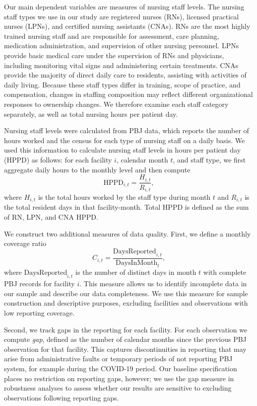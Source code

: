 \documentclass[preprint,authoryear]{elsarticle}
\begin{document}
Our main dependent variables are measures of nursing staff levels. The nursing staff types we use in our study are registered nurses (RNs), licensed practical nurses (LPNs), and certified nursing assistants (CNAs). RNs are the most highly trained nursing staff and are responsible for assessment, care planning, medication administration, and supervision of other nursing personnel. LPNs provide basic medical care under the supervision of RNs and physicians, including monitoring vital signs and administering certain treatments. CNAs provide the majority of direct daily care to residents, assisting with activities of daily living. Because these staff types differ in training, scope of practice, and compensation, changes in staffing composition may reflect different organizational responses to ownership changes. We therefore examine each staff category separately, as well as total nursing hours per patient day. 

Nursing staff levels were calculated from PBJ data, which reports the number of hours worked and the census for each type of nursing staff on a daily basis. We used this information to calculate nursing staff levels in hours per patient day (HPPD) as follows: for each facility $i$, calendar month $t$, and staff type, we first aggregate daily hours to the monthly level and then compute
\begin{equation}
  \text{HPPD}_{i,t} = \frac{H_{i,t}}{R_{i,t}},
\end{equation}
where $H_{i,t}$ is the total hours worked by the staff type during month $t$ and $R_{i,t}$ is the total resident days in that facility-month. Total HPPD is defined as the sum of RN, LPN, and CNA HPPD.

We construct two additional measures of data quality. First, we define a monthly coverage ratio
\[
  C_{i,t} = \frac{\text{DaysReported}_{i,t}}{\text{DaysInMonth}_t},
\]
where $\text{DaysReported}_{i,t}$ is the number of distinct days in month $t$ with complete PBJ records for facility $i$. This measure allows us to identify incomplete data in our sample and describe our data completeness. We use this measure for sample construction and descriptive purposes, excluding facilities and observations with low reporting coverage.

Second, we track gaps in the reporting for each facility. For each observation we compute \textit{gap}, defined as the number of calendar months since the previous PBJ observation for that facility. This captures discontinuities in reporting that may arise from administrative faults or temporary periods of not reporting PBJ system, for example during the COVID-19 period. Our baseline specification places no restriction on reporting gaps, however; we use the gap measure in robustness analyses to assess whether our results are sensitive to excluding observations following reporting gaps.
\end{document}

